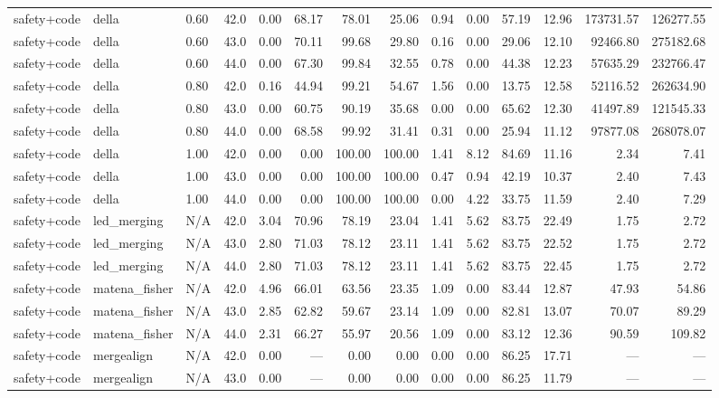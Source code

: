 \documentclass{article}
\begin{document}
\begin{table}[H]
{\begin{tabular}{llllrrrrrrrrrr}
safety+code & della & 0.60 & 42.0 & 0.00 & 68.17 & 78.01 & 25.06 & 0.94 & 0.00 & 57.19 & 12.96 & 173731.57 & 126277.55 \\
safety+code & della & 0.60 & 43.0 & 0.00 & 70.11 & 99.68 & 29.80 & 0.16 & 0.00 & 29.06 & 12.10 & 92466.80 & 275182.68 \\
safety+code & della & 0.60 & 44.0 & 0.00 & 67.30 & 99.84 & 32.55 & 0.78 & 0.00 & 44.38 & 12.23 & 57635.29 & 232766.47 \\
safety+code & della & 0.80 & 42.0 & 0.16 & 44.94 & 99.21 & 54.67 & 1.56 & 0.00 & 13.75 & 12.58 & 52116.52 & 262634.90 \\
safety+code & della & 0.80 & 43.0 & 0.00 & 60.75 & 90.19 & 35.68 & 0.00 & 0.00 & 65.62 & 12.30 & 41497.89 & 121545.33 \\
safety+code & della & 0.80 & 44.0 & 0.00 & 68.58 & 99.92 & 31.41 & 0.31 & 0.00 & 25.94 & 11.12 & 97877.08 & 268078.07 \\
safety+code & della & 1.00 & 42.0 & 0.00 & 0.00 & 100.00 & 100.00 & 1.41 & 8.12 & 84.69 & 11.16 & 2.34 & 7.41 \\
safety+code & della & 1.00 & 43.0 & 0.00 & 0.00 & 100.00 & 100.00 & 0.47 & 0.94 & 42.19 & 10.37 & 2.40 & 7.43 \\
safety+code & della & 1.00 & 44.0 & 0.00 & 0.00 & 100.00 & 100.00 & 0.00 & 4.22 & 33.75 & 11.59 & 2.40 & 7.29 \\
safety+code & led\_merging & N/A & 42.0 & 3.04 & 70.96 & 78.19 & 23.04 & 1.41 & 5.62 & 83.75 & 22.49 & 1.75 & 2.72 \\
safety+code & led\_merging & N/A & 43.0 & 2.80 & 71.03 & 78.12 & 23.11 & 1.41 & 5.62 & 83.75 & 22.52 & 1.75 & 2.72 \\
safety+code & led\_merging & N/A & 44.0 & 2.80 & 71.03 & 78.12 & 23.11 & 1.41 & 5.62 & 83.75 & 22.45 & 1.75 & 2.72 \\
safety+code & matena\_fisher & N/A & 42.0 & 4.96 & 66.01 & 63.56 & 23.35 & 1.09 & 0.00 & 83.44 & 12.87 & 47.93 & 54.86 \\
safety+code & matena\_fisher & N/A & 43.0 & 2.85 & 62.82 & 59.67 & 23.14 & 1.09 & 0.00 & 82.81 & 13.07 & 70.07 & 89.29 \\
safety+code & matena\_fisher & N/A & 44.0 & 2.31 & 66.27 & 55.97 & 20.56 & 1.09 & 0.00 & 83.12 & 12.36 & 90.59 & 109.82 \\
safety+code & mergealign & N/A & 42.0 & 0.00 & --- & 0.00 & 0.00 & 0.00 & 0.00 & 86.25 & 17.71 & --- & --- \\
safety+code & mergealign & N/A & 43.0 & 0.00 & --- & 0.00 & 0.00 & 0.00 & 0.00 & 86.25 & 11.79 & --- & --- \\

\end{tabular}}
\end{table}
\end{document}
